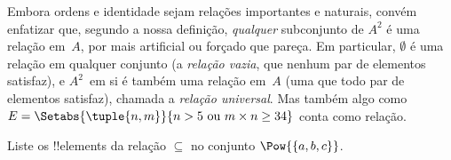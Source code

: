 \documentclass[../../../include/open-logic-section]{subfiles}
\begin{document}
\begin{explain}
Embora ordens e identidade sejam relações importantes e naturais, convém
enfatizar que, segundo a nossa definição, \emph{qualquer}
subconjunto de $A^{2}$ é uma relação em~$A$, por mais artificial ou
forçado que pareça. Em particular, $\emptyset$ é uma relação em qualquer
conjunto (a \emph{relação vazia}, que nenhum par de elementos satisfaz), e
$A^{2}$~em si é também uma relação em~$A$ (uma que todo par
de elementos satisfaz), chamada a \emph{relação universal}. Mas também algo como
$E=\Setabs{\tuple{n, m}}{n>5 \text{ ou } m \times n \ge 34}$ conta como
relação.
\end{explain}
  
\begin{prob}
  Liste os !!{element}s da relação $\subseteq$ no conjunto
  $\Pow{\{a, b, c\}}$.
\end{prob}
\end{document}
